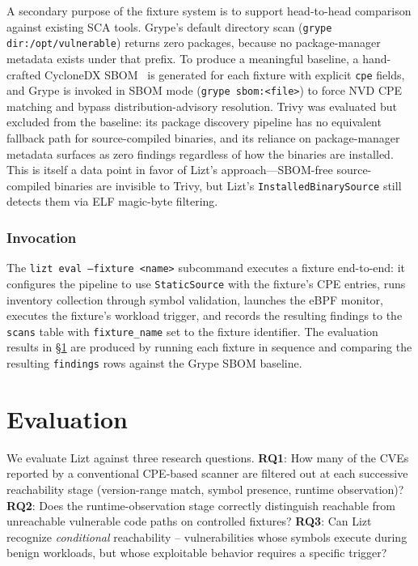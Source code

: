 \documentclass[conference]{IEEEtran}
\begin{document}
A secondary purpose of the fixture system is to support head-to-head comparison against existing SCA tools. Grype's default directory scan (\texttt{grype dir:/opt/vulnerable}) returns zero packages, because no package-manager metadata exists under that prefix. To produce a meaningful baseline, a hand-crafted CycloneDX SBOM~\cite{cyclonedx} is generated for each fixture with explicit \texttt{cpe} fields, and Grype is invoked in SBOM mode (\texttt{grype sbom:<file>}) to force NVD CPE matching and bypass distribution-advisory resolution. Trivy was evaluated but excluded from the baseline: its package discovery pipeline has no equivalent fallback path for source-compiled binaries, and its reliance on package-manager metadata surfaces as zero findings regardless of how the binaries are installed. This is itself a data point in favor of Lizt's approach---SBOM-free source-compiled binaries are invisible to Trivy, but Lizt's \texttt{InstalledBinarySource} still detects them via ELF magic-byte filtering.

\subsubsection{Invocation}

The \texttt{lizt eval --fixture <name>} subcommand executes a fixture end-to-end: it configures the pipeline to use \texttt{StaticSource} with the fixture's CPE entries, runs inventory collection through symbol validation, launches the eBPF monitor, executes the fixture's workload trigger, and records the resulting findings to the \texttt{scans} table with \texttt{fixture\_name} set to the fixture identifier. The evaluation results in \S\ref{sec:eval} are produced by running each fixture in sequence and comparing the resulting \texttt{findings} rows against the Grype SBOM baseline.

\section{Evaluation}
\label{sec:eval}

We evaluate Lizt against three research questions. \textbf{RQ1}: How many of the CVEs reported by a conventional CPE-based scanner are filtered out at each successive reachability stage (version-range match, symbol presence, runtime observation)? \textbf{RQ2}: Does the runtime-observation stage correctly distinguish reachable from unreachable vulnerable code paths on controlled fixtures? \textbf{RQ3}: Can Lizt recognize \emph{conditional} reachability -- vulnerabilities whose symbols execute during benign workloads, but whose exploitable behavior requires a specific trigger?
\end{document}
